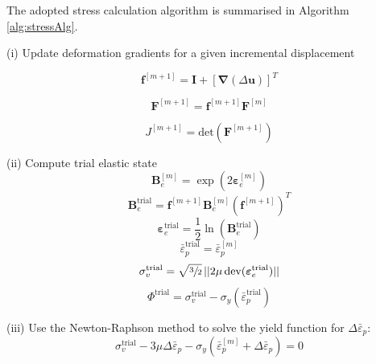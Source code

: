 \documentclass[sn-mathphys,Numbered]{sn-jnl}%
\newcommand{\bb}{\boldsymbol}
\begin{document}
The adopted stress calculation algorithm \citep{de_souza_neto_computational_2008} is summarised in Algorithm \ref{alg:stressAlg}.

\begin{algorithm}[htb] \label{alg:stressAlg} \footnotesize
\SetAlgoLined
(i) Update deformation gradients for a given incremental displacement

\begin{equation}
  \bb{f}^{[m+1]} = \bb{I} + \left[ \bb{\nabla}(\Delta\textbf{u}) \right]^T \nonumber
\end{equation}

\begin{equation}
  \bb{F}^{[m+1]} = \bb{f}^{[m+1]} \bb{F}^{[m]}  \nonumber
\end{equation}

\begin{equation}
  J^{[m+1]} = \text{det} \left( \bb{F}^{[m+1]} \right) \nonumber
\end{equation}

(ii) Compute trial elastic state
\begin{equation}
\bb{B}_{e}^{[m]} = \exp\left({2\boldsymbol{\varepsilon}_{e}^{[m]}}\right) \nonumber
\end{equation}
\begin{equation}
\bb{B}_{e}^{\text{trial}} = \bb{f}^{[m+1]}  \bb{B}_{e}^{[m]} \left(\bb{f}^{[m+1]} \right)^{T}\nonumber
\end{equation}
\begin{equation}
\boldsymbol{\varepsilon}_{e}^{\text{trial}} = \frac{1}{2} \ln\left(\textbf{B}_{e}^{\text{trial}} \right) \nonumber
\end{equation}
\begin{equation}
\bar{\varepsilon}^{\text{trial}}_p = \bar{\varepsilon}^{[m]}_p \nonumber
\end{equation}
\begin{equation}
\sigma_{v}^{\text{trial}} = \sqrt{\sfrac{3}{2}} \, || 2 \mu \, \text{dev}(\boldsymbol{\varepsilon}_{e}^{\text{trial}})|| \nonumber
\end{equation}
\begin{equation}
\Phi^{\text{trial}} =  \sigma_{v}^{\text{trial}} - \sigma_{y}(\bar{\varepsilon}^{\text{trial}}_p) \nonumber 
\end{equation}

(iii) Use the Newton-Raphson method to solve the yield function for $\Delta\bar{\varepsilon}_p$:
\begin{equation}
	\sigma_{v}^{\text{trial}} 
	- 3\mu \Delta\bar{\varepsilon}_p
	-\sigma_{y}(\bar{\varepsilon}^{[m]}_p + \Delta\bar{\varepsilon}_p) = 0 \nonumber
\end{equation}


\end{algorithm}
\end{document}
